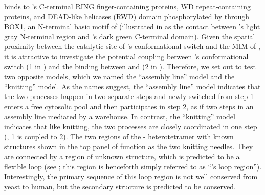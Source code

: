  binds to 's C-terminal RING finger-containing proteins, WD repeat-containing proteins, and DEAD-like helicases (RWD) domain phosphorylated by  through BOX1, an N-terminal basic motif of  \cite{Ji2017eLife, BUB1-CDC20-MAD1} (illustrated in  as the contact between 's light gray N-terminal region and 's dark green C-terminal domain). Given the spatial proximity between the catalytic site of 's conformational switch and the MIM of , it is attractive to investigate the potential coupling between 's conformational switch (\textcircled{\small{1}} in ) and the binding between  and  (\textcircled{\small{2}} in ). Therefore, we set out to test two opposite models, which we named the ``assembly line'' model and the ``knitting'' model. As the names suggest, the ``assembly line'' model indicates that the two processes happen in two separate steps and newly switched  from step \textcircled{\small{1}} enters a free cytosolic pool and then participates in step \textcircled{\small{2}}, as if two steps in an assembly line mediated by a warehouse. In contrast, the ``knitting'' model indicates that like knitting, the two processes are closely coordinated in one step  (, \textcircled{\small{1}} is coupled to \textcircled{\small{2}}). The two regions of the - heterotetramer with known structures shown in the top panel of  function as the two knitting needles. They are connected by a region of unknown structure, which is predicted to be a flexible loop (see ; this region is henceforth simply referred to as ``'s loop region''). Interestingly, the primary sequence of this loop region is not well conserved from yeast to human, but the secondary structure is predicted to be conserved.

